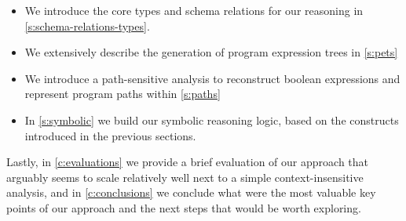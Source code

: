 \begin{itemize}
  \item We introduce the core types and schema relations for our reasoning in \ref{s:schema-relations-types}.
  \item We extensively describe the generation of program expression trees in \ref{s:pets}
  \item We introduce a path-sensitive analysis to reconstruct boolean expressions and
    represent program paths within \ref{s:paths}
  \item In \ref{s:symbolic} we build our symbolic reasoning logic, based on the constructs
    introduced in the previous sections.
\end{itemize}

Lastly, in \ref{c:evaluations} we provide a brief evaluation of our approach that arguably seems to
scale relatively well next to a simple \doop{} context-insensitive analysis, and in
\ref{c:conclusions} we conclude what were the most valuable key points of our approach and
the next steps that would be worth exploring.
